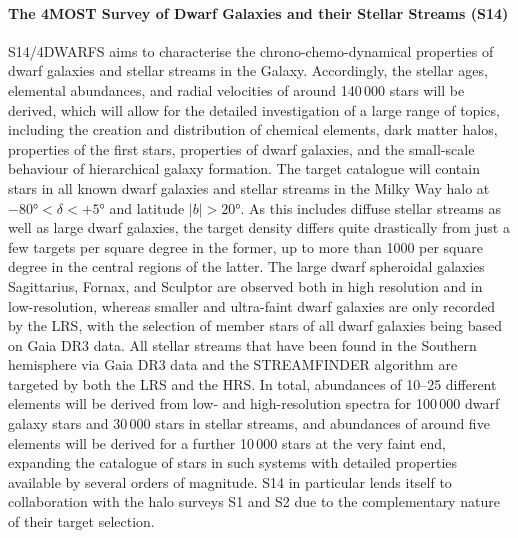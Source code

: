 \documentclass[a4paper,11pt]{article}
\begin{document}
\paragraph{The 4MOST Survey of Dwarf Galaxies and their Stellar Streams (S14)}
S14/4DWARFS \citep{4mosts14} aims to characterise the chrono-chemo-dynamical properties of dwarf galaxies and stellar streams in the Galaxy. Accordingly, the stellar ages, elemental abundances, and radial velocities of around 140\,000 stars will be derived, which will allow for the detailed investigation of a large range of topics, including the creation and distribution of chemical elements, dark matter halos, properties of the first stars, properties of dwarf galaxies, and the small-scale behaviour of hierarchical galaxy formation. The target catalogue will contain stars in all known dwarf galaxies and stellar streams in the Milky Way halo at $-80$°$<\delta<+5$° and latitude $|b|>20$°. As this includes diffuse stellar streams as well as large dwarf galaxies, the target density differs quite drastically from just a few targets per square degree in the former, up to more than 1000 per square degree in the central regions of the latter. The large dwarf spheroidal galaxies Sagittarius, Fornax, and Sculptor are observed both in high resolution and in low-resolution, whereas smaller and ultra-faint dwarf galaxies are only recorded by the LRS, with the selection of member stars of all dwarf galaxies being based on Gaia DR3 data. All stellar streams that have been found in the Southern hemisphere via Gaia DR3 data and the STREAMFINDER algorithm \citep{streamfinder} are targeted by both the LRS and the HRS. In total, abundances of 10--25 different elements will be derived from low- and high-resolution spectra for 100\,000 dwarf galaxy stars and 30\,000 stars in stellar streams, and abundances of around five elements will be derived for a further 10\,000 stars at the very faint end, expanding the catalogue of stars in such systems with detailed properties available by several orders of magnitude. S14 in particular lends itself to collaboration with the halo surveys S1 and S2 due to the complementary nature of their target selection.
%
\end{document}
